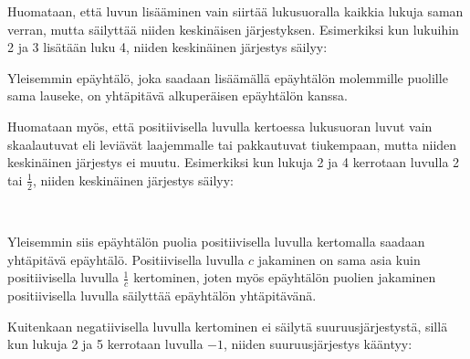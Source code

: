 Huomataan, että luvun lisääminen vain siirtää lukusuoralla kaikkia lukuja saman verran, mutta säilyttää niiden keskinäisen järjestyksen. Esimerkiksi kun lukuihin 2 ja 3 lisätään luku 4, niiden keskinäinen järjestys säilyy:

\begin{lukusuora}{-1}{10}{12}

\lukusuorauusi
\end{lukusuora}

Yleisemmin epäyhtälö, joka saadaan lisäämällä epäyhtälön molemmille puolille sama lauseke, on yhtäpitävä alkuperäisen epäyhtälön kanssa.

Huomataan myös, että positiivisella luvulla kertoessa lukusuoran luvut vain skaalautuvat eli leviävät laajemmalle tai pakkautuvat tiukempaan, mutta niiden keskinäinen järjestys ei muutu. Esimerkiksi kun lukuja 2 ja 4 kerrotaan luvulla 2 tai $\frac{1}{2}$, niiden keskinäinen järjestys säilyy:

\begin{lukusuora}{-1}{10}{12}

\lukusuorauusi
\end{lukusuora}

\ \\
\begin{lukusuora}{-1}{10}{12}

\lukusuorauusi
\end{lukusuora}

Yleisemmin siis epäyhtälön puolia positiivisella luvulla kertomalla saadaan yhtäpitävä epäyhtälö. Positiivisella luvulla $c$ jakaminen on sama asia kuin positiivisella luvulla $\frac{1}{c}$ kertominen, joten myös epäyhtälön puolien jakaminen positiivisella luvulla säilyttää epäyhtälön yhtäpitävänä.

Kuitenkaan negatiivisella luvulla kertominen ei säilytä suuruusjärjestystä, sillä kun lukuja 2 ja 5 kerrotaan luvulla $-1$, niiden suuruusjärjestys kääntyy:


